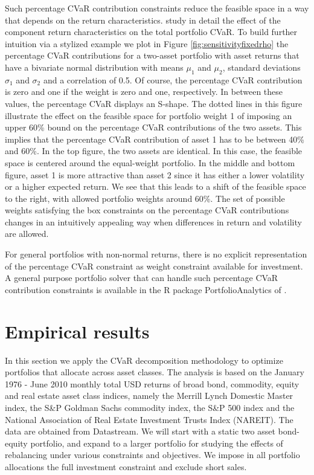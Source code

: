 \documentclass[12pt,a4paper]{article}
\begin{document}
Such percentage CVaR contribution constraints reduce the feasible space in a way that depends on the return characteristics. \citet{Stoyanov2009} study in detail the effect of the component return characteristics on the total portfolio CVaR. To build further intuition via a stylized example we plot in Figure \ref{fig:sensitivityfixedrho} the percentage CVaR contributions for a two-asset portfolio with asset returns that have a bivariate normal distribution with means $\mu_1$  and $\mu_2$, standard deviations $\sigma_1$ and $\sigma_2$  and a correlation of 0.5. Of course, the percentage CVaR contribution is zero and one if the weight is zero and one, respectively. In between these values, the percentage CVaR displays an S-shape. The dotted lines in this figure illustrate the effect on the feasible space for portfolio weight 1 of imposing an upper 60\% bound on the percentage CVaR contributions of the two assets. This implies that the percentage CVaR contribution of asset 1 has to be between 40\% and 60\%. In the top figure, the two assets are identical. In this case, the feasible space is centered around the equal-weight portfolio. In the middle and bottom figure, asset 1 is more attractive than asset 2 since it has either a lower volatility or a higher expected return. We see that this leads to a shift of the feasible space to the right, with allowed portfolio weights around 60\%. The set of possible weights satisfying the box constraints on the percentage CVaR contributions changes in an intuitively appealing way when differences in return and volatility are allowed.

For general portfolios with non-normal returns, there is no explicit representation of the percentage CVaR constraint as weight constraint available for investment. A general purpose portfolio solver that can handle such percentage CVaR contribution constraints is available in the R package PortfolioAnalytics of \citet{PortfolioAnalytics}.

\section{Empirical results \label{sec:empiricalresults}}


In this section we apply the CVaR decomposition methodology to optimize portfolios that allocate across asset classes. The analysis is based on the January 1976 - June 2010 monthly total USD returns of broad bond, commodity, equity and real estate asset class indices, namely the Merrill Lynch Domestic Master index,  the S\&P Goldman Sachs commodity index, the S\&P 500 index and the National Association of Real Estate Investment Trusts Index (NAREIT). The data are obtained from Datastream.  We will start with a static two asset bond-equity portfolio, and expand to a larger portfolio for studying the effects of rebalancing under various constraints and objectives. We impose in all portfolio allocations the full investment constraint and exclude short sales. 
\end{document}
